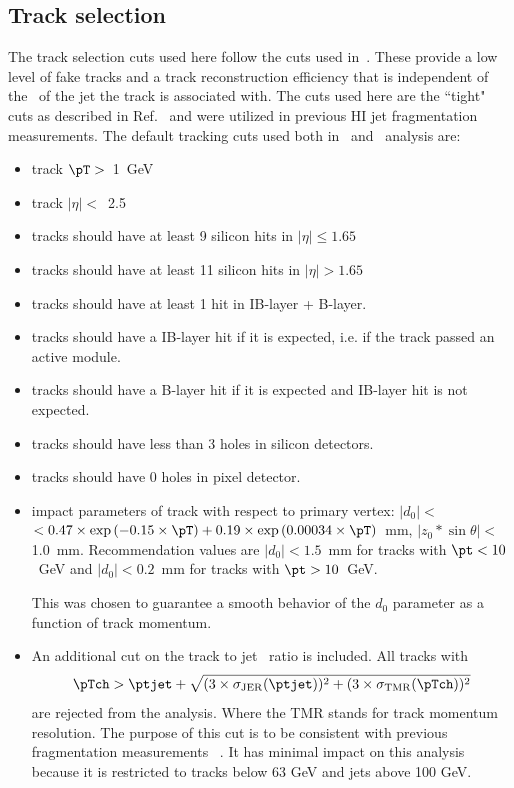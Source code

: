 \subsection{Track selection}
\label{sec:trackselection}

The track selection cuts used here follow the cuts used in~\cite{PhysRevC.98.024908}. These provide a low level of fake tracks and 
a track reconstruction efficiency that is independent of the \pt\ of the jet the track is associated with.  
The cuts used here are the ``tight" cuts as described in Ref.~\cite{ref:tracktwiki} and were utilized in previous HI jet fragmentation measurements. The default tracking cuts used both in \pp\ and \PbPb\ analysis are:
\begin{itemize}
\item{ track $\pT>$~1~GeV}
\item{ track $|\eta|<$~2.5}
\item{ tracks should have at least 9 silicon hits in $|\eta|\leq1.65$}
\item{ tracks should have at least 11 silicon hits in $|\eta|>1.65$}
\item{ tracks should have at least 1 hit in IB-layer + B-layer.}
\item{tracks should have a IB-layer hit if it is expected, i.e. if the track passed an active module.}
\item{tracks should have a B-layer hit if it is expected and IB-layer hit is not expected.}
\item{ tracks should have  less than 3 holes in silicon detectors.}
\item{ tracks should have 0 holes in pixel detector.}
\item{impact parameters of track with respect to primary vertex:  $|d_0|<$$< 0.47\times \exp{(-0.15\times\pT)} + 0.19\times \exp{(0.00034\times\pT)}$~mm, $|z_0*\sin\theta|<$1.0~mm. Recommendation values are  $|d_0| < 1.5$~mm for tracks with $\pt<10$~GeV and $|d_0| < 0.2$~mm for tracks with $\pt>10$~GeV.
  	
  	This was chosen to guarantee a smooth behavior of the $d_{0}$ parameter as a function of track momentum. }
\item{ An additional cut on the track to jet \pT\ ratio is included. All tracks with 
\begin{equation}
\pTch >  \ptjet + \sqrt{ (3 \times \sigma_{\mathrm{JER}}(\ptjet))^2 + (3 \times \sigma_{\mathrm{TMR}}(\pTch))^2} 
\end{equation}
are rejected from the analysis. Where the TMR stands for track momentum resolution. The purpose of this cut is to be consistent with previous fragmentation measurements ~\cite{PhysRevC.98.024908}. It has minimal impact on this analysis because it is restricted to tracks below 63 GeV and jets above 100 GeV. }
\end{itemize}

